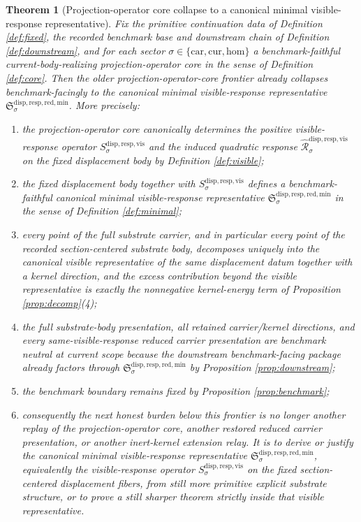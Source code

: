 \documentclass[11pt]{article}
\newcommand{\Car}{\mathrm{car}}
\newcommand{\Cur}{\mathrm{cur}}
\newcommand{\Hom}{\mathrm{hom}}
\newcommand{\CoreForcedBodyResponse}[1]{\widehat{\mathscr R}_{#1}^{\mathrm{disp,resp,vis}}}
\newcommand{\VisibleResponseOperator}[1]{S_{#1}^{\mathrm{disp,resp,vis}}}
\newcommand{\MinimalReducedStructure}{\mathfrak S^{\mathrm{disp,resp,red,min}}}
\newtheorem{theorem}{Theorem}
\begin{document}
\begin{theorem}[Projection-operator core collapse to a canonical minimal visible-response representative]
\label{thm:main}
Fix the primitive continuation data of Definition \ref{def:fixed}, the recorded benchmark base and downstream chain of Definition \ref{def:downstream}, and for each sector \(\sigma\in\{\Car,\Cur,\Hom\}\) a benchmark-faithful current-body-realizing projection-operator core in the sense of Definition \ref{def:core}. Then the older projection-operator-core frontier already collapses benchmark-facingly to the canonical minimal visible-response representative \(\MinimalReducedStructure_{\sigma}\). More precisely:
\begin{enumerate}
    \item the projection-operator core canonically determines the positive visible-response operator \(\VisibleResponseOperator{\sigma}\) and the induced quadratic response \(\CoreForcedBodyResponse{\sigma}\) on the fixed displacement body by Definition \ref{def:visible};
    \item the fixed displacement body together with \(\VisibleResponseOperator{\sigma}\) defines a benchmark-faithful canonical minimal visible-response representative \(\MinimalReducedStructure_{\sigma}\) in the sense of Definition \ref{def:minimal};
    \item every point of the full substrate carrier, and in particular every point of the recorded section-centered substrate body, decomposes uniquely into the canonical visible representative of the same displacement datum together with a kernel direction, and the excess contribution beyond the visible representative is exactly the nonnegative kernel-energy term of Proposition \ref{prop:decomp}(4);
    \item the full substrate-body presentation, all retained carrier/kernel directions, and every same-visible-response reduced carrier presentation are benchmark neutral at current scope because the downstream benchmark-facing package already factors through \(\MinimalReducedStructure_{\sigma}\) by Proposition \ref{prop:downstream};
    \item the benchmark boundary remains fixed by Proposition \ref{prop:benchmark};
    \item consequently the next honest burden below this frontier is no longer another replay of the projection-operator core, another restored reduced carrier presentation, or another inert-kernel extension relay. It is to derive or justify the canonical minimal visible-response representative \(\MinimalReducedStructure_{\sigma}\), equivalently the visible-response operator \(\VisibleResponseOperator{\sigma}\) on the fixed section-centered displacement fibers, from still more primitive explicit substrate structure, or to prove a still sharper theorem strictly inside that visible representative.
\end{enumerate}
\end{theorem}
\end{document}
